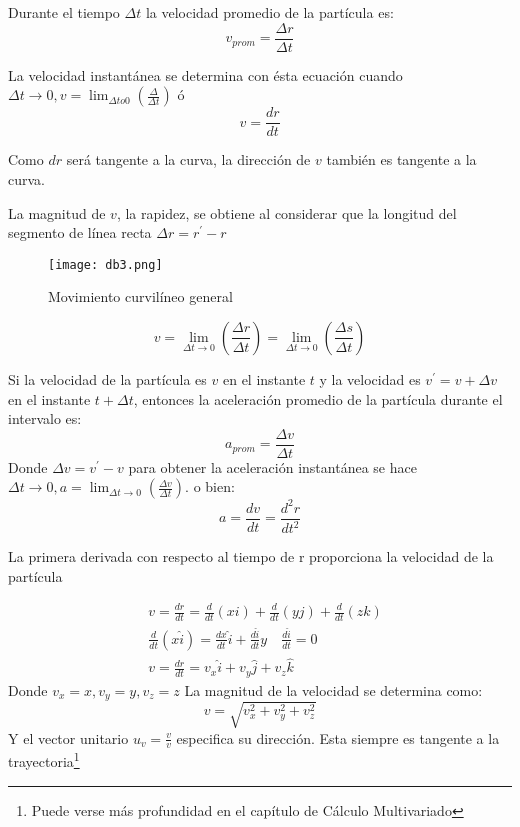 \begin{definition}[Velocidad]
    Durante el tiempo $\Delta t$ la velocidad promedio de la partícula es: 
    \begin{equation}
        v_{prom}=\frac{\Delta r}{\Delta t}
    \end{equation}
\end{definition}

La velocidad instantánea se determina con ésta ecuación cuando $\Delta t\to 0, v=\lim_{\Delta to 0}\left(\frac{\Delta}{\Delta t}\right)$ ó 
\begin{equation}
    v=\frac{dr}{dt}
\end{equation}

Como $dr$ será tangente a la curva, la dirección de $v$ también es tangente a la curva.

La magnitud de $v$, la rapidez, se obtiene al considerar que la longitud del segmento de línea recta $\Delta r=r^{\prime}-r$

\begin{figure}[h!]
    \texttt{[image: db3.png]}
    \caption{Movimiento curvilíneo general}
    \label{db3}
\end{figure}
\begin{equation}
    v=\lim_{\Delta t\to 0}\left(\frac{\Delta r}{\Delta t}\right)=\lim_{\Delta t\to 0}\left(\frac{\Delta s}{\Delta t}\right)
\end{equation}

\begin{definition}[Aceleración]
    Si la velocidad de la partícula es $v$ en el instante $t$ y la velocidad es $v^{\prime}=v+\Delta v$ en el instante $t+\Delta t$, entonces la aceleración promedio de la partícula durante el intervalo es: 
    \begin{equation}
        a_{prom}=\frac{\Delta v}{\Delta t}
    \end{equation}
    Donde $\Delta v=v^{\prime}-v$ para obtener la aceleración instantánea se hace $\Delta t\to 0, a=\lim_{\Delta t\to 0}\left(\frac{\Delta v}{\Delta t}\right)$.
    o bien:
    \begin{equation}
        a=\frac{dv}{dt}=\frac{d^2r}{dt^2}
    \end{equation}
\end{definition}

La primera derivada con respecto al tiempo de r proporciona la velocidad de la partícula

\begin{align*}
    &v=\frac{dr}{dt}=\frac{d}{dt}(xi)+\frac{d}{dt}(yj)+\frac{d}{dt}(zk)\\ 
    &\frac{d}{dt}(x\hat{i})=\frac{dx}{dt}\hat{i}+\frac{d\hat{i}}{dt}y\quad \frac{d\hat{i}}{dt}=0\\
    &v=\frac{dr}{dt}=v_x\hat{i}+v_y\hat{j}+v_z\hat{k}
\end{align*}
Donde $v_x=x,v_y=y,v_z=z$ La magnitud de la velocidad se determina como: 
\begin{equation}
    v=\sqrt{v_x^2+v_y^2+v_z^2}
\end{equation}
Y el vector unitario $u_v=\frac{v}{v}$ especifica su dirección. Esta siempre es tangente a la trayectoria\footnote{Puede verse más profundidad en el capítulo de Cálculo Multivariado}

